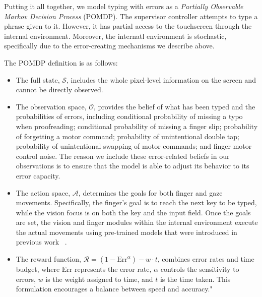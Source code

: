 

Putting it all together, we model typing with errors as a \emph{Partially Observable Markov Decision Process} (POMDP).
The supervisor controller attempts to type a phrase given to it.
However, it has partial access to the touchscreen through the internal environment. 
Moreover, the internatl environment is stochastic, specifically due to the error-creating mechanisms we describe above.

The POMDP definition is as follows:
\begin{itemize}
    \item The full state, $\mathcal{S}$, includes the whole pixel-level information on the screen and cannot be directly observed.
    \item The observation space, $\mathcal{O}$, provides the belief of what has been typed and the probabilities of errors, including conditional probability of missing a typo when proofreading; conditional probability of missing a finger slip; probability of forgetting a motor command; probability of unintentional double tap; probability of unintentional swapping of motor commands; and finger motor control noise. The reason we include these error-related beliefs in our observations is to ensure that the model is able to adjust its behavior to its error capacity.
    \item The action space, $\mathcal{A}$, determines the goals for both finger and gaze movements. Specifically, the finger's goal is to reach the next key to be typed, while the vision focus is on both the key and the input field. Once the goals are set, the vision and finger modules within the internal environment execute the actual movements using pre-trained models that were introduced in previous work ~\cite{shi2024crtypist}.
    \item The reward function, $\mathcal{R} = (1 - \text{Err}^{\alpha}) - w \cdot t$, combines error rates and time budget, where $\text{Err}$ represents the error rate, $\alpha$ controls the sensitivity to errors, $w$ is the weight assigned to time, and $t$ is the time taken. This formulation encourages a balance between speed and accuracy."
\end{itemize}

